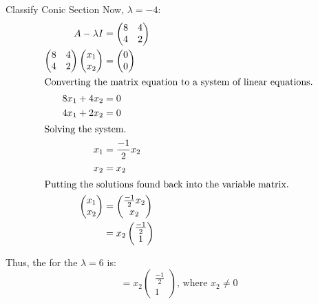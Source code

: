 \begin{example}{Classify Conic Section}
  Now, $\lambda = -4$:
  \begin{align*}
    A - \lambda I &=
                    \begin{pmatrix}
                      8 & 4 \\
                      4 & 2
                    \end{pmatrix} \\
    \begin{pmatrix}
      8 & 4 \\
      4 & 2
    \end{pmatrix}
          \begin{pmatrix}
            x_{1} \\ x_{2}
          \end{pmatrix} &=
                          \begin{pmatrix}
                            0 \\ 0
                          \end{pmatrix} \\
    \intertext{Converting the matrix equation to a system of linear equations.}
    8x_{1} + 4x_{2} &= 0 \\
    4x_{1} + 2x_{2} &= 0 \\
    \intertext{Solving the system.}
    x_{1} &= \frac{-1}{2} x_{2} \\
    x_{2} &= x_{2} \\
    \intertext{Putting the solutions found back into the variable matrix.}
    \begin{pmatrix}
      x_{1} \\ x_{2}
    \end{pmatrix} &=
                    \begin{pmatrix}
                      \frac{-1}{2} x_{2} \\ x_{2}
                    \end{pmatrix} \\
    &= x_{2}
      \begin{pmatrix}
        \frac{-1}{2} \\ 1
      \end{pmatrix}
  \end{align*}

  Thus, the  for the  $\lambda = 6$ is:
  \begin{equation*}
    = x_{2}
    \begin{pmatrix}
      \frac{-1}{2} \\ 1
    \end{pmatrix}\text{, where } x_{2} \neq 0
  \end{equation*}


\end{example}
